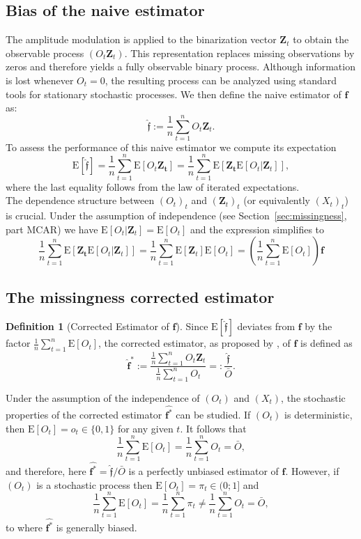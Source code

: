 ﻿\documentclass[12pt,a4paper]{scrreprt}
\theoremstyle{definition}
\newtheorem{definition}[theorem]{Definition}
\begin{document}
\subsection*{Bias of the naive estimator}
The amplitude modulation is applied to the binarization vector $\boldsymbol{Z}_t$ to obtain the observable process $(O_t \boldsymbol{Z}_t)$. 
This representation replaces missing observations by zeros and therefore yields a fully observable binary process. Although information is lost whenever $O_t=0$, 
the resulting process can be analyzed using standard tools for stationary stochastic processes.
We then define the naive estimator of $\boldsymbol{f}$ as:
\[\hat{\boldsymbol{\mathfrak{f}}}:= \frac{1}{n} \sum_{t=1}^{n}O_t \boldsymbol{Z}_t.\]
To assess the performance of this naive estimator we compute its expectation
\[\mathrm{E}[\hat{\boldsymbol{\mathfrak{f}}}] = \frac{1}{n} \sum_{t = 1}^{n} \mathrm{E}[O_t\boldsymbol{Z_t}] = \frac{1}{n} \sum_{t = 1}^{n} \mathrm{E}[\boldsymbol{Z_t} \mathrm{E}[O_t|\boldsymbol{Z}_t]],\]
where the last equality follows from the law of iterated expectations.\\
The dependence structure between $(O_t)_t$ and $(\boldsymbol{Z}_t)_t$ (or equivalently $(X_t)_t$) is crucial. Under the assumption of independence (see Section~\ref{sec:missingness}, part MCAR) we have $\mathrm{E}[O_t|\boldsymbol{Z}_t] = \mathrm{E}[O_t]$ and the expression simplifies to
\[\frac{1}{n} \sum_{t = 1}^{n} \mathrm{E}[\boldsymbol{Z_t} \mathrm{E}[O_t|\boldsymbol{Z}_t]] = \frac{1}{n}\sum_{t=1}^{n} \mathrm{E}[\boldsymbol{Z}_t]  \mathrm{E}[O_t] = \left(\frac{1}{n} \sum_{t=1}^{n} \mathrm{E}[O_t]\right) \boldsymbol{f} \]
\subsection*{The missingness corrected estimator}
\begin{definition}[Corrected Estimator of $\boldsymbol{f}$]\label{def:correctedest}
Since $\mathrm{E}[\hat{\boldsymbol{\mathfrak{f}}}]$ deviates from $\boldsymbol{f}$
by the factor $\frac{1}{n}\sum_{t=1}^{n}\mathrm{E}[O_t]$, the corrected estimator, as proposed by \citet{weiss2021categorical}, 
of $\boldsymbol{f}$ is defined as
\[
    \hat{\boldsymbol{f}}^*
    := \frac{\frac{1}{n} \sum_{t=1}^{n}O_t \boldsymbol{Z}_t}
            {\frac{1}{n}\sum_{t=1}^{n} O_t}
    =: \frac{\hat{\boldsymbol{\mathfrak{f}}}}{\bar{O}}.
\]\end{definition}
\noindent Under the assumption of the independence of $(O_t)$ and $(X_t)$, the stochastic properties of the corrected estimator $\hat{\boldsymbol{f^*}}$ can be studied. If $(O_t)$ is deterministic, then $\mathrm{E}[O_t] = o_t \in \{0,1\}$ for any given $t$. It follows that
\[\frac{1}{n}\sum_{t=1}^{n} \mathrm{E}[O_t] = \frac{1}{n}\sum_{t=1}^{n} O_t = \bar{O},\]
and therefore, here $\hat{\boldsymbol{f}^*} = \hat{\boldsymbol{\mathfrak{f}}}/\bar{O}$ is a perfectly unbiased estimator of $\boldsymbol{f}$. However, if $(O_t)$ is a stochastic process then $\mathrm{E}[O_t] = \pi_t \in (0; 1]$ and
\[\frac{1}{n}\sum_{t=1}^{n} \mathrm{E}[O_t]= \frac{1}{n}\sum_{t=1}^{n} \pi_t \neq \frac{1}{n}\sum_{t=1}^{n} O_t = \bar{O},\]
to where $\hat{\boldsymbol{f^*}}$ is generally biased.
\end{document}
